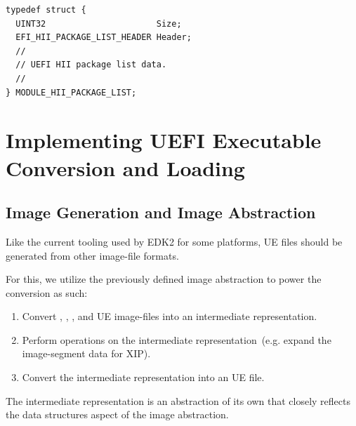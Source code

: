 \begin{lstfloat}[ht]
  \centering
  \begin{lstlisting}[style=c]
typedef struct {
  UINT32                      Size;
  EFI_HII_PACKAGE_LIST_HEADER Header;
  //
  // UEFI HII package list data.
  //
} MODULE_HII_PACKAGE_LIST;
  \end{lstlisting}
  \caption{Data Structure for the UEFI HII Package List.}
  \label{fig:new_hii_image}
  \caption*{The data structure that encodes the \gls{UEFI-HII} package list in a novel approach. Unlike the conventional \gls{UEFI} solution, which uses the -specific resource directory that requires extra parsing, we utilize a regular  struct instance. To preserve the flexibility of the former method, the data structure is self-contained and forced into a dedicated \gls{image-segment} similarly to before.}
\end{lstfloat}

\chapter{Implementing UEFI Executable Conversion and Loading}
\label{chap:uefi_exec_impl}

\section{Image Generation and Image Abstraction}

Like the current tooling used by \gls{EDK2} for some platforms, \gls{UE} files should be generated from other \gls{image-file} formats.

For this, we utilize the previously defined \gls{image} abstraction to power the conversion as such:

\begin{enumerate}
  \item Convert , , , and \gls{UE} \glspl{image-file} into an intermediate representation.
  \item Perform operations on the intermediate representation~(e.g. expand the \gls{image-segment} data for \gls{XIP}).
  \item Convert the intermediate representation into an \gls{UE} file.
\end{enumerate}

The intermediate representation is an abstraction of its own that closely reflects the data structures aspect of the \gls{image} abstraction.

